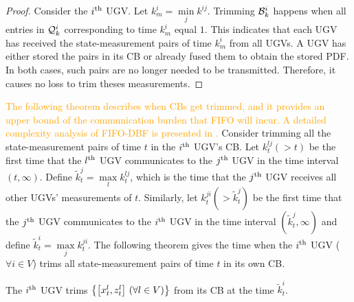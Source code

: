 	\begin{proof}
		
		Consider the $i^\text{th}$ UGV. Let $k^i_m=\min\limits_j k^{ij}$. 
		Trimming $\mathcal{B}^i_k$ happens when all entries in $\mathcal{Q}^i_k$ corresponding to time $k^i_m$ equal $1$. 
		This indicates that each UGV has received the state-measurement pairs of time $k^i_m$ from all UGVs.
		A UGV has either stored the pairs in its CB or already fused them to obtain the stored PDF.
		In both cases, such pairs are no longer needed to be transmitted. %
		Therefore, it causes no loss to trim theses measurements.		
	\end{proof}
	
	\textcolor{orange}{The following theorem describes when CBs get trimmed, and it provides an upper bound of the communication burden that FIFO will incur.
	A detailed complexity analysis of FIFO-DBF is presented in .}
	Consider trimming all the state-measurement pairs of time $t$ in the $i^\text{th}$ UGV's CB.
	Let $k^{lj}_t (>t)$ be the first time that the $l^\text{th}$ UGV communicates to the $j^\text{th}$ UGV in the time interval $(t,\infty)$.
	Define $\tilde{k}^j_t=\max\limits_l k^{lj}_t$, which is the time that the $j^\text{th}$ UGV receives all other UGVs' measurements of $t$.
	Similarly, let $k^{ji}_t (> \tilde{k}^j_t)$ be the first time that the $j^\text{th}$ UGV communicates to the $i^\text{th}$ UGV in the time interval $(\tilde{k}^j_t,\infty)$ and define $\tilde{k}^i_t=\max\limits_j k^{ji}_t$.
	The following theorem gives the time when the $i^\text{th}$ UGV ($\forall i\in V$) trims all state-measurement pairs of time $t$ in its own CB.
	\begin{thm}\label{thm:upd_tl_freq}		
		The $i^\text{th}$ UGV trims $\left\lbrace\left[x^l_t,z^l_t\right] \,(\forall l\in V)\right\rbrace$ from its CB at the time $\tilde{k}^i_t$.
	\end{thm}
	
